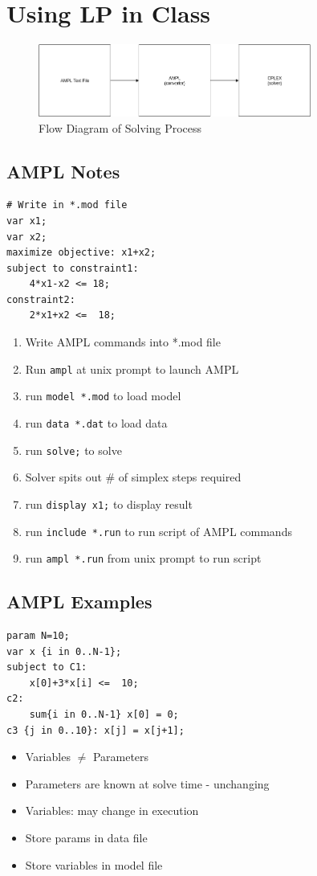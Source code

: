 \documentclass[12pt, letter]{article}
\begin{document}
\section{Using LP in Class}%
\label{sec:using_lp_in_class}
\begin{figure}[h]
    \centering
    \includegraphics[width=0.8\textwidth]{solver}
    \caption{Flow Diagram of Solving Process}
    \label{fig:solver}
\end{figure}

\subsection*{AMPL Notes}

\begin{verbatim}
# Write in *.mod file
var x1;
var x2;
maximize objective: x1+x2;
subject to constraint1:
    4*x1-x2 <= 18;
constraint2:
    2*x1+x2 <=  18;
\end{verbatim}

\begin{enumerate}
    \item Write AMPL commands into *.mod file
    \item Run \texttt{ampl} at unix prompt to launch AMPL
    \item run \texttt{model *.mod} to load model
    \item run \texttt{data *.dat} to load data
    \item run \texttt{solve;}  to solve
    \item Solver spits out \# of simplex steps required
    \item run \texttt{display x1;} to display result
    \item run \texttt{include *.run} to run script of AMPL commands
    \item run \texttt{ampl *.run} from unix prompt to run script
\end{enumerate}

\subsection*{AMPL Examples}

\begin{verbatim}
param N=10;
var x {i in 0..N-1};
subject to C1:
    x[0]+3*x[i] <=  10;
c2:
    sum{i in 0..N-1} x[0] = 0;
c3 {j in 0..10}: x[j] = x[j+1];
\end{verbatim}

\begin{itemize}
    \item Variables $\ne$ Parameters
    \item Parameters are known at solve time - unchanging
    \item Variables: may change in execution
    \item Store params in data file
    \item Store variables in model file
\end{itemize}
\end{document}
